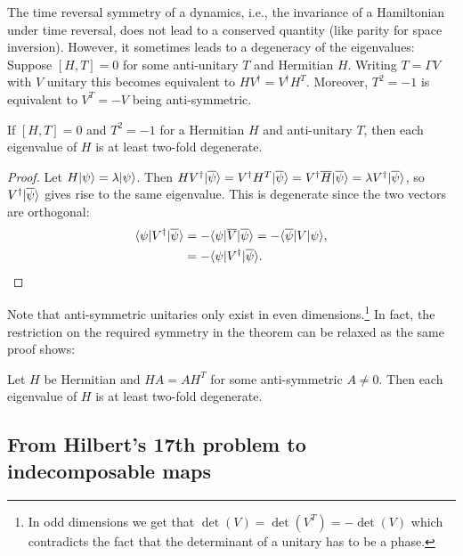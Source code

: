 \documentclass[11pt,a4paper]{article}
\numberwithin{equation}{section}
\begin{document}
The time reversal symmetry of a dynamics, i.e., the invariance of a Hamiltonian under time reversal, does not lead to a
conserved quantity (like parity for space inversion). However, it sometimes leads to a degeneracy of the eigenvalues:
Suppose $[H,T]=0$ for some anti-unitary $T$ and Hermitian $H$. Writing $T=\Gamma V$ with $V$ unitary this becomes
equivalent to $HV^\dagger = V^\dagger H^T$. Moreover, $T^2=-1$ is equivalent to $V^T=-V$ being anti-symmetric.

\begin{theorem}
    If $[H,T]=0$ and $T^2=-1$ for a Hermitian $H$ and anti-unitary $T$, then each eigenvalue of $H$ is at least two-fold
    degenerate.
\end{theorem}

\begin{proof}
    Let $H|\psi\rangle=\lambda|\psi\rangle$. Then $HV^\dagger|\overline{\psi}\rangle=V^\dagger H^T|\overline{\psi}\rangle
        =V^\dagger \overline{H}|\overline{\psi}\rangle=\lambda V^\dagger|\overline{\psi}\rangle$, so $V^\dagger|\overline{\psi}\rangle$
    gives rise to the same eigenvalue. This is degenerate since the two vectors are orthogonal:
    \begin{align}
        \langle\psi|V^\dagger|\overline{\psi}\rangle
         &= -\langle\psi|\overline{V}|\overline{\psi}\rangle
        = -\langle\overline{\psi}|V|\psi\rangle,
        \label{eq:ch3:3.29}
        \\
         &= -\langle\psi|V^\dagger|\overline{\psi}\rangle.
        \label{eq:ch3:3.30}
    \end{align}
\end{proof}

Note that anti-symmetric unitaries only exist in even dimensions.\footnote{In odd dimensions we get that
    $\det(V)=\det(V^T)=-\det(V)$ which contradicts the fact that the determinant of a unitary has to be a phase.} In fact,
the restriction on the required symmetry in the theorem can be relaxed as the same proof shows:

\begin{theorem}
    Let $H$ be Hermitian and $HA=AH^T$ for some anti-symmetric $A\neq 0$. Then each eigenvalue of $H$ is at least two-fold
    degenerate.
\end{theorem}

\subsection{From Hilbert's 17th problem to indecomposable maps}
\end{document}
